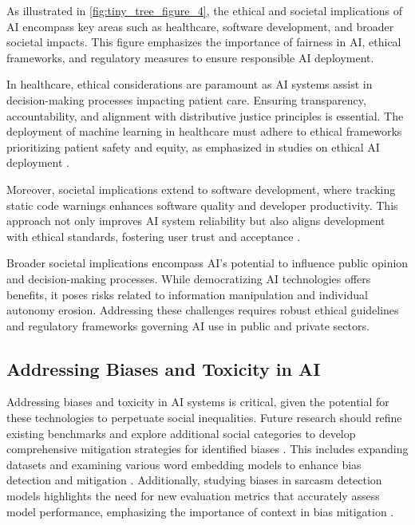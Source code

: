 As illustrated in \autoref{fig:tiny_tree_figure_4}, the ethical and societal implications of AI encompass key areas such as healthcare, software development, and broader societal impacts. This figure emphasizes the importance of fairness in AI, ethical frameworks, and regulatory measures to ensure responsible AI deployment.

In healthcare, ethical considerations are paramount as AI systems assist in decision-making processes impacting patient care. Ensuring transparency, accountability, and alignment with distributive justice principles is essential. The deployment of machine learning in healthcare must adhere to ethical frameworks prioritizing patient safety and equity, as emphasized in studies on ethical AI deployment \cite{shanks2004speculationgraphcomputationarchitectures}. 

Moreover, societal implications extend to software development, where tracking static code warnings enhances software quality and developer productivity. This approach not only improves AI system reliability but also aligns development with ethical standards, fostering user trust and acceptance \cite{li2024trackingevolutionstaticcode}. 

Broader societal implications encompass AI's potential to influence public opinion and decision-making processes. While democratizing AI technologies offers benefits, it poses risks related to information manipulation and individual autonomy erosion. Addressing these challenges requires robust ethical guidelines and regulatory frameworks governing AI use in public and private sectors.


\subsection{Addressing Biases and Toxicity in AI} \label{subsec:Addressing Biases and Toxicity in AI}

Addressing biases and toxicity in AI systems is critical, given the potential for these technologies to perpetuate social inequalities. Future research should refine existing benchmarks and explore additional social categories to develop comprehensive mitigation strategies for identified biases \cite{magee2021intersectionalbiascausallanguage}. This includes expanding datasets and examining various word embedding models to enhance bias detection and mitigation \cite{spinde2021identificationbiasedtermsnews}. Additionally, studying biases in sarcasm detection models highlights the need for new evaluation metrics that accurately assess model performance, emphasizing the importance of context in bias mitigation \cite{nimase2024morecontextshelpsarcasm}.

